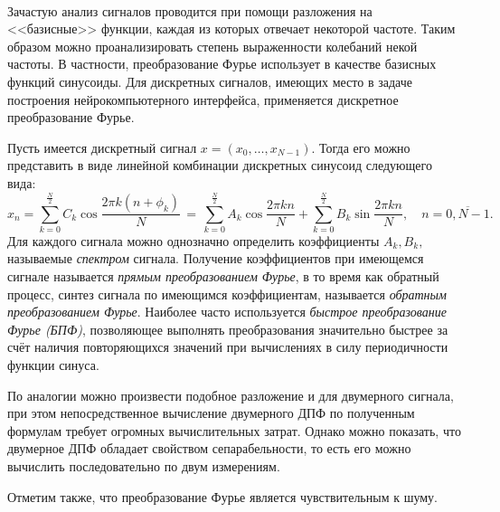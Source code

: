 \documentclass[12pt,a4paper,oneside,fleqn,leqno]{article}
\newcounter{pe} %
\newcommand*{\Nep}{\addtocounter{pe}{1}{\arabic{pe}$^{\circ}$.\;}}
\newcommand*{\NepS}{\mbox{} \\ \Nep}
\begin{document}
	\NepS {\bf Преобразование Фурье}
	\par Зачастую анализ сигналов проводится при помощи разложения на <<базисные>> функции, каждая из которых отвечает некоторой частоте. Таким образом можно проанализировать степень выраженности колебаний некой частоты. В частности, преобразование Фурье использует в качестве базисных функций синусоиды. Для дискретных сигналов, имеющих место в задаче построения нейрокомпьютерного интерфейса, применяется дискретное преобразование Фурье.
	\par Пусть имеется дискретный сигнал $x = (x_0, \dots, x_{N-1})$. Тогда его можно представить в виде линейной комбинации дискретных синусоид следующего вида:
$$x_n = \sum_{k=0}^{\frac{N}{2}} C_k \cos{\frac{2 \pi k (n + \phi_k)}{N}}\, = \, \sum_{k=0}^{\frac{N}{2}} A_k \cos{\frac{2 \pi k n}{N}} + \sum_{k=0}^{\frac{N}{2}} B_k \sin{\frac{2 \pi k n}{N}}, \quad n = \overline{0, N-1}.$$
	Для каждого сигнала можно однозначно определить коэффициенты $A_k, B_k,$ называемые {\it спектром} сигнала. Получение коэффициентов при имеющемся сигнале называется {\it прямым преобразованием Фурье}, в то время как обратный процесс, синтез сигнала по имеющимся коэффициентам, называется {\it обратным преобразованием Фурье}. Наиболее часто используется {\it быстрое преобразование Фурье (БПФ)}, позволяющее выполнять преобразования значительно быстрее за счёт  наличия повторяющихся значений при вычислениях в силу периодичности функции синуса. 
	\par По аналогии можно произвести подобное разложение и для двумерного сигнала, при этом непосредственное вычисление двумерного ДПФ по полученным формулам требует огромных вычислительных затрат. Однако можно показать, что двумерное ДПФ обладает свойством сепарабельности, то есть его можно вычислить последовательно по двум измерениям. 
	\par Отметим также, что преобразование Фурье является чувствительным к шуму.
\end{document}

